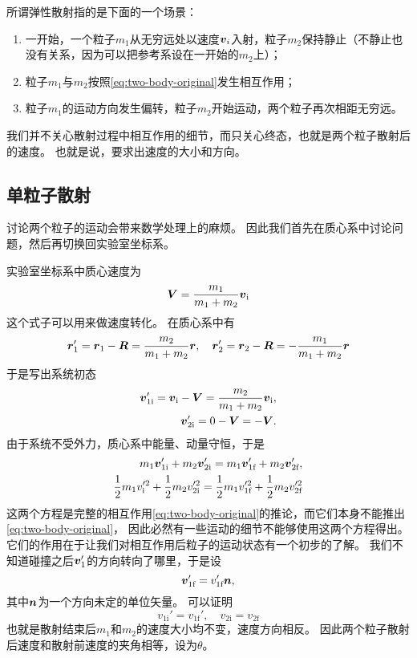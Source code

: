 所谓弹性散射指的是下面的一个场景：
\begin{enumerate}
    \item 一开始，一个粒子$m_1$从无穷远处以速度$\vb*{v}_i$入射，粒子$m_2$保持静止（不静止也没有关系，因为可以把参考系设在一开始的$m_2$上）；
    \item 粒子$m_1$与$m_2$按照\eqref{eq:two-body-original}发生相互作用；
    \item 粒子$m_1$的运动方向发生偏转，粒子$m_2$开始运动，两个粒子再次相距无穷远。
\end{enumerate}
我们并不关心散射过程中相互作用的细节，而只关心终态，也就是两个粒子散射后的速度。
也就是说，要求出速度的大小和方向。

\subsection{单粒子散射}

讨论两个粒子的运动会带来数学处理上的麻烦。
因此我们首先在质心系中讨论问题，然后再切换回实验室坐标系。

实验室坐标系中质心速度为
\[
    \vb*{V} = \frac{m_1}{m_1 + m_2} \vb*{v}_\text{i}
\]
这个式子可以用来做速度转化。
在质心系中有
\[
    \vb*{r}_1' = \vb*{r}_1 - \vb*{R} = \frac{m_2}{m_1 + m_2} \vb*{r}, 
    \quad \vb*{r}_2' = \vb*{r}_2 - \vb*{R} = - \frac{m_1}{m_1 + m_2} \vb*{r}
\]
于是写出系统初态
\[
    \begin{split}
        \vb*{v}_{1\text{i}}' = \vb*{v}_\text{i} - \vb*{V} = \frac{m_2}{m_1 + m_2} \vb*{v}_\text{i}, \\
        \vb*{v}_{2\text{i}}' = 0 - \vb*{V} = - \vb*{V}.
    \end{split}
\]
由于系统不受外力，质心系中能量、动量守恒，于是
\[
    \begin{split}
        m_1 \vb*{v}'_{1\text{i}} + m_2 \vb*{v}'_{2\text{i}} = m_1 \vb*{v}'_{1\text{f}} + m_2 \vb*{v}'_{2\text{f}}, \\
        \frac{1}{2} m_1 v_\text{i}'^2 + \frac{1}{2} m_2 v_{2\text{i}}'^2 = \frac{1}{2} m_1 v_{1\text{f}}'^2 + \frac{1}{2} m_2 v_{2\text{f}}'^2
    \end{split}
\]
这两个方程是完整的相互作用\eqref{eq:two-body-original}的推论，而它们本身不能推出\eqref{eq:two-body-original}，
因此必然有一些运动的细节不能够使用这两个方程得出。
它们的作用在于让我们对相互作用后粒子的运动状态有一个初步的了解。
我们不知道碰撞之后$\vb*{v}_1'$的方向转向了哪里，于是设
\[
    \vb*{v}_{1\text{f}}' = v_{1\text{f}}' \vb*{n},
\]
其中$\vb*{n}$为一个方向未定的单位矢量。
可以证明
\[
    v_{1\text{i}}' = v_{1\text{f}}', \quad v_{2\text{i}} = v_{2\text{f}}
\]
也就是散射结束后$m_1$和$m_2$的速度大小均不变，速度方向相反。
因此两个粒子散射后速度和散射前速度的夹角相等，设为$\theta$。

